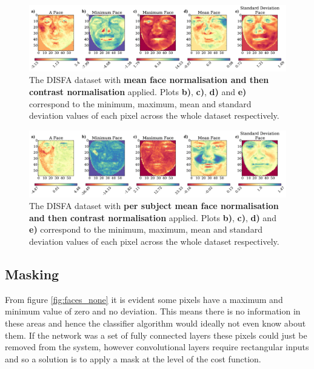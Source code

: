       \begin{figure}[!h] \centering
      \includegraphics[width =\hsize]{figures/faces_contrast_face.pdf}
      \caption{The DISFA dataset with {\bf mean face normalisation and then contrast normalisation} applied.
      Plots {\bf b)}, {\bf c)}, {\bf d)} and {\bf e)} correspond to the minimum,
      maximum, mean and standard deviation values of each pixel across the whole
      dataset respectively.} \label{fig:faces_contrast_face} \end{figure}

      \begin{figure}[!h] \centering
      \includegraphics[width =\hsize]{figures/faces_per_subject_contrast_face.pdf}
      \caption{The DISFA dataset with {\bf per subject mean face normalisation and then contrast normalisation} applied.
      Plots {\bf b)}, {\bf c)}, {\bf d)} and {\bf e)} correspond to the minimum,
      maximum, mean and standard deviation values of each pixel across the whole
      dataset respectively.} \label{fig:faces_per_subject_contrast_face} \end{figure}

    \subsection{Masking} \label{sec:mask}
      From figure \ref{fig:faces_none} it is evident some pixels have a maximum and minimum value
      of zero and no deviation. This means there is no information in these areas and hence
      the classifier algorithm would ideally not even know about them. If the network was a set of fully connected layers
      these pixels could just be removed from the system, however convolutional layers require
      rectangular inputs and so a solution is to apply a mask at the level of the cost function.

